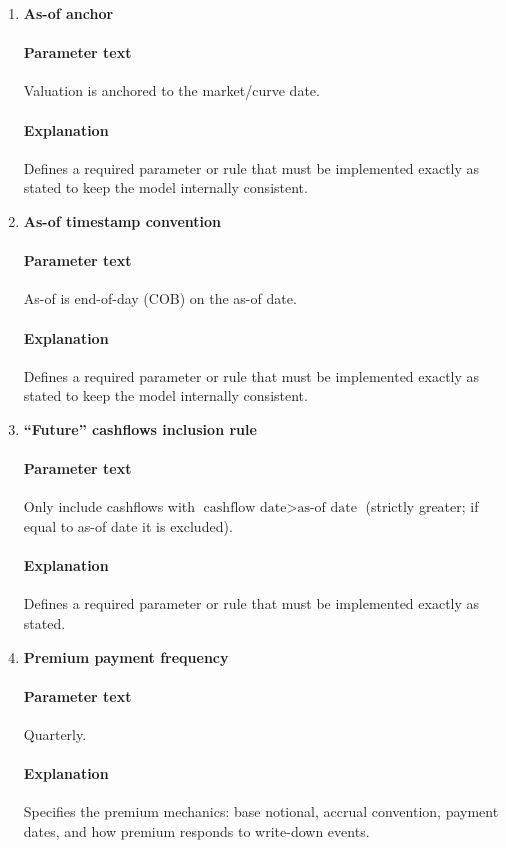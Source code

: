 \documentclass[11pt]{article}
\begin{document}
\begin{enumerate}[label=\arabic*),leftmargin=*,align=left]

\item \textbf{As-of anchor}
\paragraph{Parameter text} Valuation is anchored to the market/curve date.
\paragraph{Explanation} Defines a required parameter or rule that must be implemented exactly as stated to keep the model internally consistent.

\item \textbf{As-of timestamp convention}
\paragraph{Parameter text} As-of is end-of-day (COB) on the as-of date.
\paragraph{Explanation} Defines a required parameter or rule that must be implemented exactly as stated to keep the model internally consistent.

\item \textbf{``Future'' cashflows inclusion rule}
\paragraph{Parameter text} Only include cashflows with $\text{cashflow date} > \text{as-of date}$ (strictly greater; if equal to as-of date it is excluded).
\paragraph{Explanation} Defines a required parameter or rule that must be implemented exactly as stated.

\item \textbf{Premium payment frequency}
\paragraph{Parameter text} Quarterly.
\paragraph{Explanation} Specifies the premium mechanics: base notional, accrual convention, payment dates, and how premium responds to write-down events.


\end{enumerate}
\end{document}

